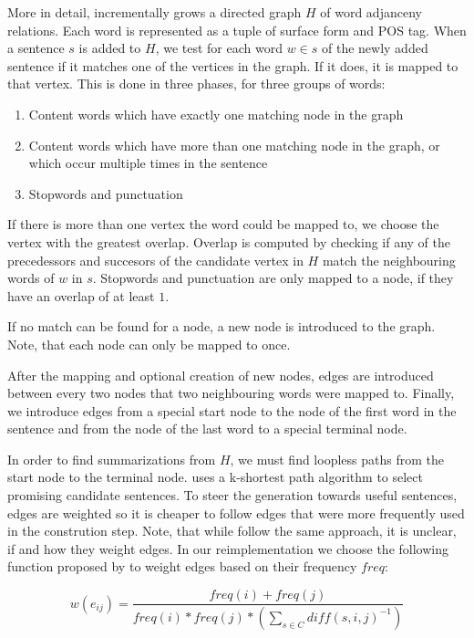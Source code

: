 \documentclass[a4paper,BCOR=10mm]{report}
\numberwithin{lemma}{chapter}
\numberwithin{definition}{chapter}
\begin{document}
More in detail, \citeauthor{filippova} incrementally grows a directed graph $H$ of word adjanceny relations. Each word is represented as a tuple of surface form and POS tag. When a sentence $s$ is added to $H$, we test for each word $w \in s$ of the newly added sentence if it matches one of the vertices in the graph. If it does, it is mapped to that vertex. This is done in three phases, for three groups of words:

\begin{enumerate}
\item{Content words which have exactly one matching node in the graph}
\item{Content words which have more than one matching node in the graph, or which occur multiple times in the sentence}
\item{Stopwords and punctuation} %
\end{enumerate}

If there is more than one vertex the word could be mapped to, we choose the vertex with the greatest overlap. Overlap is computed by checking if any of the precedessors and succesors of the candidate vertex in $H$ match the neighbouring words of $w$ in $s$.
Stopwords and punctuation are only mapped to a node, if they have an overlap of at least $1$.

If no match can be found for a node, a new node is introduced to the graph. Note, that each node can only be mapped to once.

After the mapping and optional creation of new nodes, edges are introduced between every two nodes that two neighbouring words were mapped to.
Finally, we introduce edges from a special start node to the node of the first word in the sentence and from the node of the last word to a special terminal node.

In order to find summarizations from $H$, we must find loopless paths from the start node to the terminal node. \citet{filippova} uses a k-shortest path algorithm to select promising candidate sentences. To steer the generation towards useful sentences, edges are weighted so it is cheaper to follow edges that were more frequently used in the constrution step. Note, that while \citeauthor{banerjee} follow the same approach, it is unclear, if and how they weight edges.
In our reimplementation we choose the following function proposed by \citeauthor{filippova} to weight edges based on their frequency $\mathit{freq}$:

\begin{equation}
w(e_{ij}) = \frac{\mathit{freq}(i) + \mathit{freq}(j)} {\mathit{freq}(i) * \mathit{freq}(j) * (\sum_{s \in C} \mathit{diff}(s, i, j)^{-1})}
\end{equation}
\end{document}
